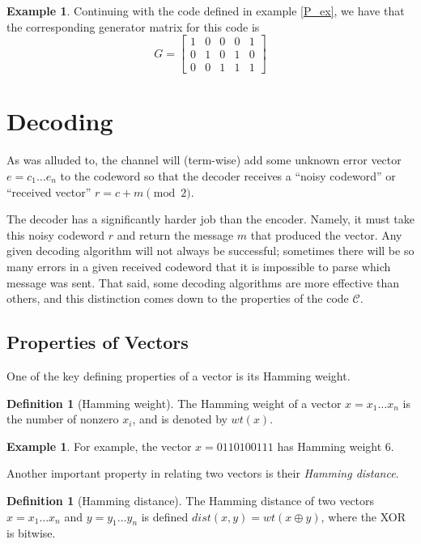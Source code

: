 \documentclass[12pt,twoside]{reedthesis}
\theoremstyle{definition}
\newtheorem{definition}[theorem]{Definition}
\newtheorem{example}[theorem]{Example}
\begin{document}
\begin{example}
Continuing with the code defined in example \ref{P_ex}, we have that the corresponding generator matrix for this code is 
\begin{equation*}
G = 
\left[
\begin{array}{ccc|cc}
1 & 0 & 0 	& 0 & 1	  \\
0 & 1& 0	& 	1 & 0 \\
0 & 0 & 1 	& 1 & 1
\end{array}
\right]
\end{equation*}
\end{example}

\section{Decoding}
As was alluded to, the channel will (term-wise) add some unknown error vector $e = c_1 \ldots e_n$ to the codeword so that the decoder receives a ``noisy codeword'' or ``received vector'' $r = c + m \pmod 2$. 

The decoder has a significantly harder job than the encoder. Namely, it must take this noisy codeword $r$ and return the message $m$ that produced the vector. Any given decoding algorithm will not always be successful; sometimes there will be so many errors in a given received codeword that it is impossible to parse which message was sent. That said, some decoding algorithms are more effective than others, and this distinction comes down to the properties of the code $\mathscr{C}$.

\subsection{Properties of Vectors}

One of the key defining properties of a vector is its Hamming weight.
\begin{definition}[Hamming weight] The Hamming weight of a vector $x = x_1  \ldots x_n$ is the number of nonzero $x_i$, and is denoted by $wt(x)$.
\end{definition}

\begin{example}
For example, the vector $x = 0110100111$ has Hamming weight 6.
\end{example}

Another important property in relating two vectors is their \textit{Hamming distance}.
\begin{definition}[Hamming distance] The Hamming distance of two vectors $x = x_1  \ldots x_n$  and $y = y_1 \ldots y_n$ is defined $dist(x,y) = wt(x \oplus y)$, where the XOR is bitwise.
\end{definition}
\end{document}
